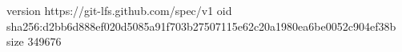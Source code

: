 version https://git-lfs.github.com/spec/v1
oid sha256:d2bb6d888ef020d5085a91f703b27507115e62c20a1980ea6be0052c904ef38b
size 349676
